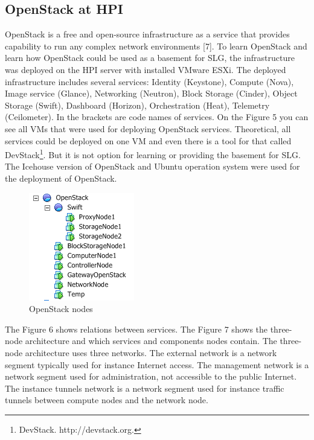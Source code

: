   


 




\subsection{OpenStack at HPI}
OpenStack is a free and open-source infrastructure as a service that provides capability to run any complex network environments [7]. To learn OpenStack and learn how OpenStack could be used as a basement for SLG, the infrastructure was deployed on the HPI server with installed VMware ESXi. The deployed infrastructure includes several services: Identity (Keystone), Compute (Nova), Image service (Glance), Networking (Neutron), Block Storage (Cinder), Object Storage (Swift), Dashboard (Horizon), Orchestration (Heat), Telemetry (Ceilometer). In the brackets are code names of services. On the Figure 5 you can see all VMs that were used for deploying OpenStack services. Theoretical, all services could be deployed on one VM and even there is a tool for that called DevStack\footnote{DevStack. http://devstack.org.}. But it is not option for learning or providing the basement for SLG. The Icehouse version of OpenStack and Ubuntu operation system were used for the deployment of OpenStack.  

\begin{figure}[ht!]
\centering
\includegraphics{openstack_tree.png}
\caption{OpenStack nodes}
\label{overflow}
\end{figure}

The Figure 6 shows relations between services. The Figure 7 shows the three-node architecture and which services and components nodes contain. The three-node  architecture uses three networks. The external network is a network segment typically used for instance Internet access. The management network is a network segment used for administration, not accessible to the public Internet. The instance tunnels network is a network segment used for instance traffic tunnels between compute nodes and the network node.





